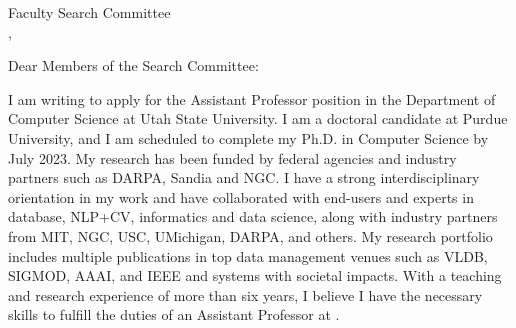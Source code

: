 \documentclass[9pt]{article}
\begin{document}
\thispagestyle{plain}

\pagestyle{empty}

Faculty Search Committee \\
\DepartmentName, 
\InstitutionName \\
\DepartmentAddress


Dear Members of the Search Committee:

I am writing to apply for the Assistant Professor position in the Department of Computer Science at Utah State University.
I am a doctoral candidate at Purdue University, and I am scheduled to complete my Ph.D. in Computer Science by July 2023. My research has been funded by federal agencies and industry partners such as DARPA, Sandia and NGC. I have a strong interdisciplinary orientation in my work and have collaborated with end-users and experts in database, NLP+CV, informatics and data science, along with industry partners from MIT, NGC, USC, UMichigan, DARPA, and others. My research portfolio includes multiple publications in top data management venues such as VLDB, SIGMOD, AAAI, and IEEE and systems with societal impacts. With a teaching and research experience of more than six years, I believe I have the necessary skills to fulfill the duties of an Assistant Professor at \InstitutionName{}.
 
\end{document}
